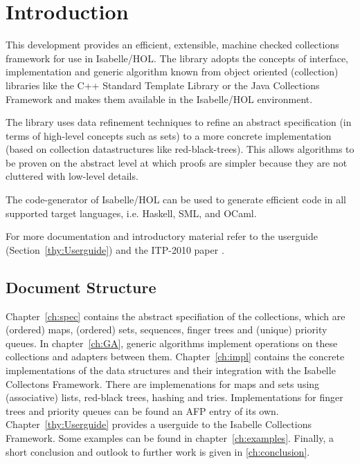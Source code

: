 \chapter{Introduction}
  This development provides an efficient, extensible, machine checked collections framework for use
  in Isabelle/HOL. The library adopts the concepts of interface, implementation and generic algorithm
  known from object oriented (collection) libraries like the C++ Standard Template Library\cite{C++STL} or 
  the Java Collections Framework\cite{JavaCollFr} and makes them available in the Isabelle/HOL environment.

  The library uses data refinement techniques to refine an abstract specification (in terms of high-level concepts such as sets) to a more concrete implementation (based on collection datastructures like red-black-trees).
  This allows algorithms to be proven on the abstract level at which proofs are simpler because they are not cluttered with low-level details.

  The code-generator of Isabelle/HOL can be used to generate efficient code in all supported target languages, i.e. Haskell, SML, and OCaml.

  For more documentation and introductory material refer to the userguide (Section~\ref{thy:Userguide}) and the ITP-2010 paper \cite{LammichLochbihler2010ITP}.

\section{Document Structure}
  Chapter~\ref{ch:spec} contains the abstract specifiation of the collections, which are (ordered) maps, (ordered) sets, sequences, finger trees and (unique) priority queues.
  In chapter~\ref{ch:GA}, generic algorithms implement operations on these collections and adapters between them.
  Chapter~\ref{ch:impl} contains the concrete implementations of the data structures and their integration with the Isabelle Collectons Framework.
  There are implemenations for maps and sets using (associative) lists, red-black trees, hashing and tries.
  Implementations for finger trees and priority queues can be found an AFP entry of its own.
  Chapter~\ref{thy:Userguide} provides a userguide to the Isabelle Collections Framework.
  Some examples can be found in chapter~\ref{ch:examples}.
  Finally, a short conclusion and outlook to further work is given in \ref{ch:conclusion}.

